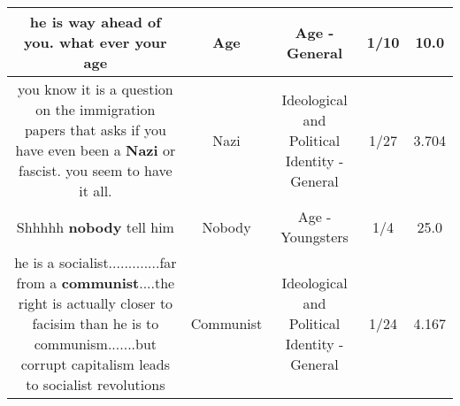 \documentclass[11pt]{article}
\newlength\mylength
\begin{document}
\begin{center}
\begin{longtable}{|C{.65\mylength}|C{.30\mylength}|C{.12\mylength}|C{.12\mylength}|C{.12\mylength}|}
  \small he is way ahead of you. what ever your age\normalsize   & Age & Age - General & 1/10 & 10.0 \\  \hline
  \small you know it is a question on the immigration papers that asks if you have even been a \textbf{Nazi} or fascist. you seem to have it all.\normalsize   & Nazi &  Ideological and Political Identity - General & 1/27 & 3.704 \\  \hline
  \small Shhhhh \textbf{nobody} tell him\normalsize   & Nobody & Age - Youngsters & 1/4 & 25.0 \\  \hline
  \small he is a socialist.............far from a \textbf{communist}....the right is actually closer to facisim than he is to communism.......but corrupt capitalism leads to socialist revolutions\normalsize   & Communist &  Ideological and Political Identity - General & 1/24 & 4.167 \\  \hline

\end{longtable}
\end{center}
\end{document}
